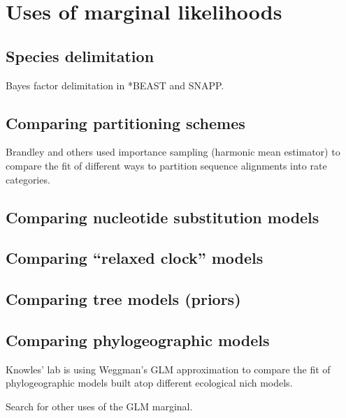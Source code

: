 \section{Uses of marginal likelihoods}

\subsection{Species delimitation}

Bayes factor delimitation in *BEAST and SNAPP.

\subsection{Comparing partitioning schemes}

Brandley and others used importance sampling (harmonic mean estimator) to
compare the fit of different ways to partition sequence alignments into rate
categories.

\subsection{Comparing nucleotide substitution models}

\subsection{Comparing ``relaxed clock'' models}

\subsection{Comparing tree models (priors)}

\subsection{Comparing phylogeographic models}

Knowles' lab is using Weggman's GLM approximation to compare the fit of
phylogeographic models built atop different ecological nich models.

Search for other uses of the GLM marginal.
